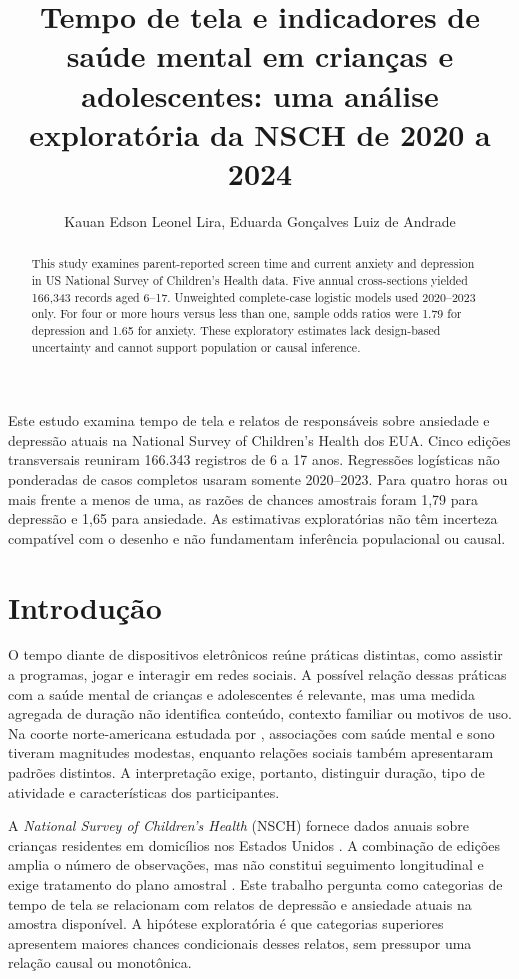 ﻿\documentclass[12pt]{article}
\title{Tempo de tela e indicadores de saúde mental em crianças e adolescentes: uma análise exploratória da NSCH de 2020 a 2024}
\author{Kauan Edson Leonel Lira\inst{1}, Eduarda Gonçalves Luiz de Andrade\inst{1}}
\begin{document}
\maketitle
\begin{abstract}
This study examines parent-reported screen time and current anxiety and depression in US National Survey of Children's Health data. Five annual cross-sections yielded 166,343 records aged 6--17. Unweighted complete-case logistic models used 2020--2023 only. For four or more hours versus less than one, sample odds ratios were 1.79 for depression and 1.65 for anxiety. These exploratory estimates lack design-based uncertainty and cannot support population or causal inference.
\end{abstract}
\begin{resumo}
Este estudo examina tempo de tela e relatos de responsáveis sobre ansiedade e depressão atuais na National Survey of Children's Health dos EUA. Cinco edições transversais reuniram 166.343 registros de 6 a 17 anos. Regressões logísticas não ponderadas de casos completos usaram somente 2020--2023. Para quatro horas ou mais frente a menos de uma, as razões de chances amostrais foram 1,79 para depressão e 1,65 para ansiedade. As estimativas exploratórias não têm incerteza compatível com o desenho e não fundamentam inferência populacional ou causal.
\end{resumo}
\section{Introdução}
O tempo diante de dispositivos eletrônicos reúne práticas distintas, como assistir a programas, jogar e interagir em redes sociais. A possível relação dessas práticas com a saúde mental de crianças e adolescentes é relevante, mas uma medida agregada de duração não identifica conteúdo, contexto familiar ou motivos de uso. Na coorte norte-americana estudada por \cite{paulich2021}, associações com saúde mental e sono tiveram magnitudes modestas, enquanto relações sociais também apresentaram padrões distintos. A interpretação exige, portanto, distinguir duração, tipo de atividade e características dos participantes.

A \textit{National Survey of Children's Health} (NSCH) fornece dados anuais sobre crianças residentes em domicílios nos Estados Unidos \cite{censusdata}. A combinação de edições amplia o número de observações, mas não constitui seguimento longitudinal e exige tratamento do plano amostral \cite{censusguide}. Este trabalho pergunta como categorias de tempo de tela se relacionam com relatos de depressão e ansiedade atuais na amostra disponível. A hipótese exploratória é que categorias superiores apresentem maiores chances condicionais desses relatos, sem pressupor uma relação causal ou monotônica.
\end{document}
